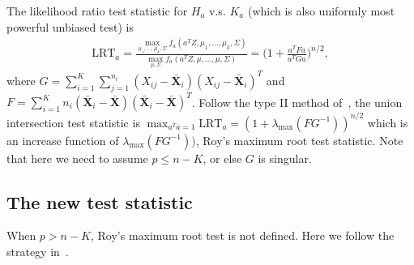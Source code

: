 \documentclass[review]{elsarticle}
\theoremstyle{plain}
\theoremstyle{definition}
\theoremstyle{remark}
\begin{document}
The likelihood ratio test statistic for $H_a$ v.s. $K_a$ (which is also uniformly most powerful unbiased test) is
\begin{equation*}
    \begin{aligned}
        \text{LRT}_{a}=\frac{\max_{\mu_1,\ldots,\mu_k,\Sigma}f_a(a^T Z,\mu_1,\ldots,\mu_k,\Sigma)}{\max_{\mu,\Sigma}f_a(a^T Z,\mu,\ldots,\mu,\Sigma)}
        =
        \Big(1+\frac{a^T Fa}{a^T G a}\Big)^{n/2},
    \end{aligned}
\end{equation*}
where $G=\sum_{i=1}^K\sum_{j=1}^{n_i}(X_{ij}-\bar{\mathbf{X}}_i)(X_{ij}-\bar{\mathbf{X}}_i)^T$ and $F=\sum_{i=1}^K n_i (\bar{\mathbf{X}}_i-\bar{\mathbf{X}})(\bar{\mathbf{X}}_i-\bar{\mathbf{X}})^T$.
Follow the type II method of~\cite{Roy1953}, the union intersection test statistic is $\max_{a^T a=1}\text{LRT}_a=(1+\lambda_{\max}(FG^{-1}))^{n/2}$ which is an increase function of $\lambda_{\max}(FG^{-1}))$, Roy's maximum root test statistic.
Note that here we need to assume $p\leq n-K$, or else $G$ is singular.
\subsection{The new test statistic}
When $p> n-K$, Roy's maximum root test is not defined. Here we follow the strategy in~\cite{Zhao2016A}.
\end{document}
